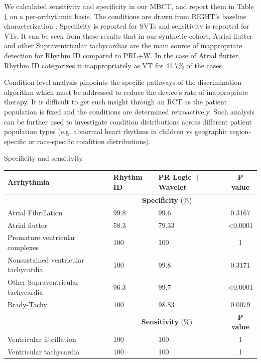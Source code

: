 We calculated sensitivity and specificity in our MBCT, and report them in Table \ref{table:vtsvt} on a per-arrhythmia basis.
The conditions are drawn from RIGHT's baseline characterization \cite{GoldABBTB11_RIGHTresults}.
Specificity is reported for SVTs and sensitivity is reported for VTs.
It can be seen from these results that in our synthetic cohort, Atrial flutter and other Supraventricular tachycardias are the main source of inappropriate detection for Rhythm ID compared to PRL+W.
In the case of Atrial flutter, Rhythm ID categorizes it inappropriately as VT for 41.7\% of the cases.

Condition-level analysis pinpoints the specific pathways of the discrimination algorithm which must be addressed to reduce the device's rate of inappropriate therapy. It is difficult to get such insight through an RCT as the patient population is fixed and the conditions are determined retroactively. Such analysis can be further used to investigate condition distributions across different patient population types (e.g. abnormal heart rhythms in children vs geographic region-specific or race-specific condition distributions).   

\begin{table}[t]
	Specificity and sensitivity.
\begin{tabular}{|p{2.8cm}|p{1.5cm}|p{1.5cm}|c|}
	\hline Arrhythmia & Rhythm ID & PR Logic + Wavelet  & P value \\ 
	\hline &	\multicolumn{2}{|c|}{\textbf{Specificity} (\%)}& \\
	\hline Atrial Fibrillation & 99.8 & 99.6 & 0.3167 \\ 
	\hline \cellcolor{blue!25} Atrial flutter & 58.3 & 79.33 & <0.0001 \\ 
	\hline Premature ventricular complexes & 100 & 100 & 1 \\ 
	\hline Nonsustained ventricular tachycardia & 100 & 99.8 & 0.3171 \\ 
	\hline \cellcolor{blue!25} Other Supraventricular tachycardia & 96.3 & 99.7 & <0.0001 \\ 
	\hline Brady-Tachy & 100 & 98.83 & 0.0079 \\ 
		\hline
	\hline &	\multicolumn{2}{|c|}{\textbf{Sensitivity} (\%)} & \textbf{P value}\\
	\hline Ventricular fibrillation & 100 & 100 & 1 \\ 
	\hline Ventricular tachycardia & 100 & 100 & 1 \\ 
	\hline 
\end{tabular} 
\label{table:vtsvt}
\end{table}

